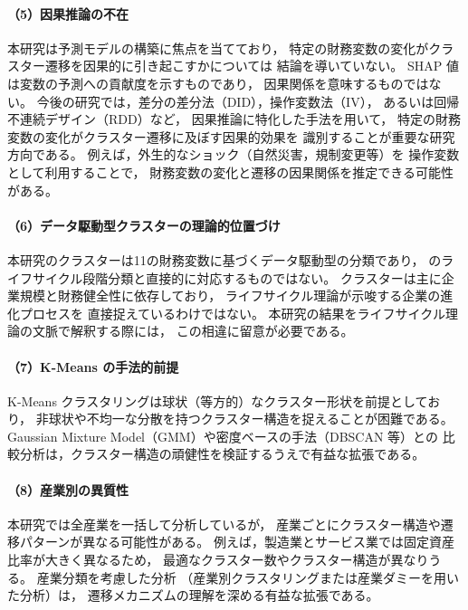 \paragraph{（5）因果推論の不在}
本研究は予測モデルの構築に焦点を当てており，
特定の財務変数の変化がクラスター遷移を因果的に引き起こすかについては
結論を導いていない。
SHAP 値は変数の予測への貢献度を示すものであり，
因果関係を意味するものではない。
今後の研究では，差分の差分法（DID），操作変数法（IV），
あるいは回帰不連続デザイン（RDD）など，
因果推論に特化した手法を用いて，
特定の財務変数の変化がクラスター遷移に及ぼす因果的効果を
識別することが重要な研究方向である。
例えば，外生的なショック（自然災害，規制変更等）を
操作変数として利用することで，
財務変数の変化と遷移の因果関係を推定できる可能性がある。

\paragraph{（6）データ駆動型クラスターの理論的位置づけ}
本研究のクラスターは11の財務変数に基づくデータ駆動型の分類であり，
 のライフサイクル段階分類と直接的に対応するものではない。
クラスターは主に企業規模と財務健全性に依存しており，
ライフサイクル理論が示唆する企業の進化プロセスを
直接捉えているわけではない。
本研究の結果をライフサイクル理論の文脈で解釈する際には，
この相違に留意が必要である。

\paragraph{（7）K-Means の手法的前提}
K-Means クラスタリングは球状（等方的）なクラスター形状を前提としており，
非球状や不均一な分散を持つクラスター構造を捉えることが困難である。
Gaussian Mixture Model（GMM）や密度ベースの手法（DBSCAN 等）との
比較分析は，クラスター構造の頑健性を検証するうえで有益な拡張である。

\paragraph{（8）産業別の異質性}
本研究では全産業を一括して分析しているが，
産業ごとにクラスター構造や遷移パターンが異なる可能性がある。
例えば，製造業とサービス業では固定資産比率が大きく異なるため，
最適なクラスター数やクラスター構造が異なりうる。
産業分類を考慮した分析
（産業別クラスタリングまたは産業ダミーを用いた分析）は，
遷移メカニズムの理解を深める有益な拡張である。
